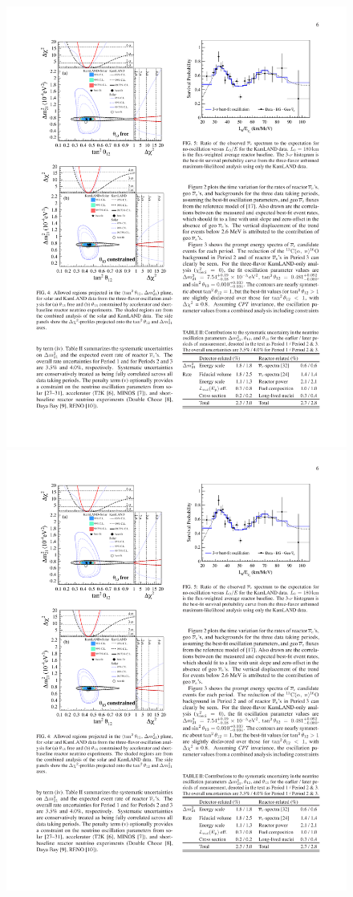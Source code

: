\begin{figure}[htbp]
\begin{minipage}[c]{.46\linewidth}
   	      \includegraphics[width=0.9\linewidth]{figures/kamland_LE.pdf}
   \end{minipage} \hfill
   \begin{minipage}{.46\linewidth}
      \includegraphics[width=0.9\linewidth]{figures/kamland_dmth.pdf}

\end{minipage}
\end{figure}
